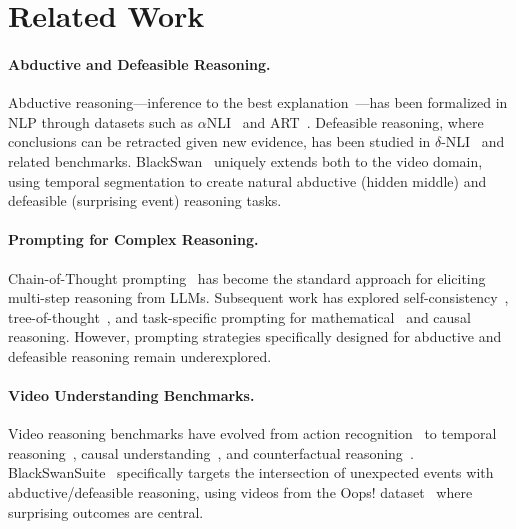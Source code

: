 \documentclass[10pt,twocolumn,letterpaper]{article}
\begin{document}
\section{Related Work}
\label{sec:related}

\paragraph{Abductive and Defeasible Reasoning.}
Abductive reasoning---inference to the best explanation~\cite{peirce1935collected}---has been formalized in NLP through datasets such as $\alpha$NLI~\cite{bhagavatula2020abductive} and ART~\cite{bhagavatula2020abductive}. Defeasible reasoning, where conclusions can be retracted given new evidence, has been studied in $\delta$-NLI~\cite{rudinger2020thinking} and related benchmarks. BlackSwan~\cite{chinchure2025black} uniquely extends both to the video domain, using temporal segmentation to create natural abductive (hidden middle) and defeasible (surprising event) reasoning tasks.

\paragraph{Prompting for Complex Reasoning.}
Chain-of-Thought prompting~\cite{wei2022chain} has become the standard approach for eliciting multi-step reasoning from LLMs. Subsequent work has explored self-consistency~\cite{wang2023selfconsistency}, tree-of-thought~\cite{yao2023tree}, and task-specific prompting for mathematical~\cite{ahn2024large} and causal~\cite{jin2024cladder} reasoning. However, prompting strategies specifically designed for abductive and defeasible reasoning remain underexplored.

\paragraph{Video Understanding Benchmarks.}
Video reasoning benchmarks have evolved from action recognition~\cite{kay2017kinetics} to temporal reasoning~\cite{mangalam2024egoschema}, causal understanding~\cite{li2022causalvid}, and counterfactual reasoning~\cite{li2023counterfactual}. BlackSwanSuite~\cite{chinchure2025black} specifically targets the intersection of unexpected events with abductive/defeasible reasoning, using videos from the Oops! dataset~\cite{epstein2020oops} where surprising outcomes are central.

\end{document}
